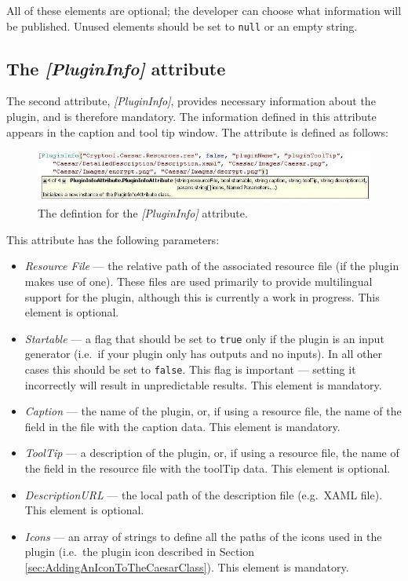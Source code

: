 All of these elements are optional; the developer can choose what information will be published. Unused elements should be set to \texttt{null} or an empty string.
\clearpage

\subsection{The \protect\textit{[PluginInfo]} attribute}
\label{sec:ThePluginInfoAttribute}

The second attribute, \textit{[PluginInfo]}, provides necessary information about the plugin, and is therefore mandatory. The information defined in this attribute appears in the caption and tool tip window. The attribute is defined as follows:

\begin{figure}[h]
	\centering
		\includegraphics[width=1.00\textwidth]{figures/attribute_plugininfo.jpg}
	\caption{The defintion for the \textit{[PluginInfo]} attribute.}
	\label{fig:attribute_plugininfo}
\end{figure}

\noindent This attribute has the following parameters:

\begin{itemize}
	\item \textit{Resource File} --- the relative path of the associated resource file (if the plugin makes use of one). These files are used primarily to provide multilingual support for the plugin, although this is currently a work in progress. This element is optional.
	\item \textit{Startable} --- a flag that should be set to \texttt{true} only if the plugin is an input generator (i.e.\ if your plugin only has outputs and no inputs). In all other cases this should be set to \texttt{false}. This flag is important --- setting it incorrectly will result in unpredictable results. This element is mandatory.
	\item \textit{Caption} --- the name of the plugin, or, if using a resource file, the name of the field in the file with the caption data. This element is mandatory.
	\item \textit{ToolTip} --- a description of the plugin, or, if using a resource file, the name of the field in the resource file with the toolTip data. This element is optional.
	\item \textit{DescriptionURL} --- the local path of the description file (e.g.\ XAML file). This element is optional.
	\item \textit{Icons} --- an array of strings to define all the paths of the icons used in the plugin (i.e.\ the plugin icon described in Section \ref{sec:AddingAnIconToTheCaesarClass}). This element is mandatory.
\end{itemize}


